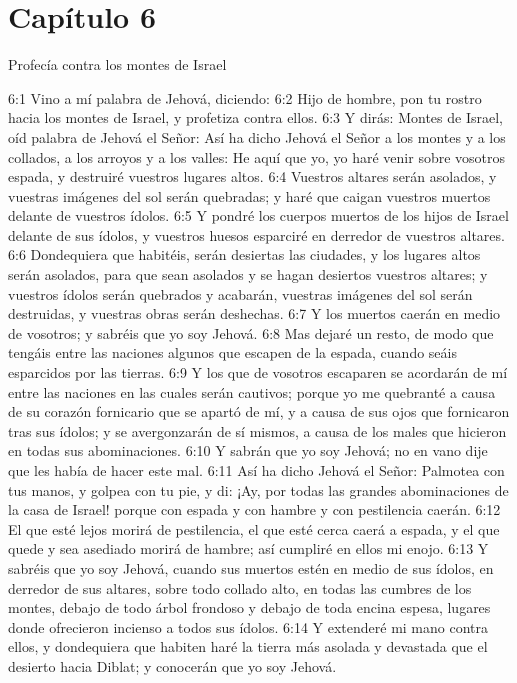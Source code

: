 \section*{Capítulo 6  }
Profecía contra los montes de Israel   
  
6:1 Vino a mí palabra de Jehová, diciendo:   
6:2 Hijo de hombre, pon tu rostro hacia los montes de Israel, y profetiza contra ellos.   
6:3 Y dirás: Montes de Israel, oíd palabra de Jehová el Señor: Así ha dicho Jehová el Señor a los montes y a los collados, a los arroyos y a los valles: He aquí que yo, yo haré venir sobre vosotros espada, y destruiré vuestros lugares altos.   
6:4 Vuestros altares serán asolados, y vuestras imágenes del sol serán quebradas; y haré que caigan vuestros muertos delante de vuestros ídolos.   
6:5 Y pondré los cuerpos muertos de los hijos de Israel delante de sus ídolos, y vuestros huesos esparciré en derredor de vuestros altares.   
6:6 Dondequiera que habitéis, serán desiertas las ciudades, y los lugares altos serán asolados, para que sean asolados y se hagan desiertos vuestros altares; y vuestros ídolos serán quebrados y acabarán, vuestras imágenes del sol serán destruidas, y vuestras obras serán deshechas.   
6:7 Y los muertos caerán en medio de vosotros; y sabréis que yo soy Jehová.   
6:8 Mas dejaré un resto, de modo que tengáis entre las naciones algunos que escapen de la espada, cuando seáis esparcidos por las tierras.   
6:9 Y los que de vosotros escaparen se acordarán de mí entre las naciones en las cuales serán cautivos; porque yo me quebranté a causa de su corazón fornicario que se apartó de mí, y a causa de sus ojos que fornicaron tras sus ídolos; y se avergonzarán de sí mismos, a causa de los males que hicieron en todas sus abominaciones.   
6:10 Y sabrán que yo soy Jehová; no en vano dije que les había de hacer este mal.   
6:11 Así ha dicho Jehová el Señor: Palmotea con tus manos, y golpea con tu pie, y di: ¡Ay, por todas las grandes abominaciones de la casa de Israel! porque con espada y con hambre y con pestilencia caerán.   
6:12 El que esté lejos morirá de pestilencia, el que esté cerca caerá a espada, y el que quede y sea asediado morirá de hambre; así cumpliré en ellos mi enojo.   
6:13 Y sabréis que yo soy Jehová, cuando sus muertos estén en medio de sus ídolos, en derredor de sus altares, sobre todo collado alto, en todas las cumbres de los montes, debajo de todo árbol frondoso y debajo de toda encina espesa, lugares donde ofrecieron incienso a todos sus ídolos.   
6:14 Y extenderé mi mano contra ellos, y dondequiera que habiten haré la tierra más asolada y devastada que el desierto hacia Diblat; y conocerán que yo soy Jehová.   

